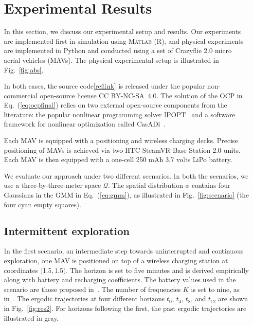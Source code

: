 \documentclass[letterpaper,10pt,conference,twoside]{IEEEtran}
\theoremstyle{definition}
\begin{document}
\section{Experimental Results}\label{sec:res}
\noindent
In this section, we discuss our experimental setup and results. Our experiments are implemented first in simulation using  \textsc{Matlab} (R), and physical experiments  are implemented in Python and conducted using a set of Crazyflie 2.0 micro aerial vehicles (MAVs). The physical experimental setup is illustrated in Fig.~\ref{fig:abs}.

In both cases, the source code\cref{reflink} is released under the popular non-commercial open-source license CC BY-NC-SA~4.0. The solution of the OCP in Eq.~(\ref{eq:ocpfinal}) relies on two external open-source components from the literature: the popular nonlinear programming solver IPOPT~\cite{wachter2006implementation} and a software framework for nonlinear optimization called CasADi~\cite{andersson2012casadi}.

Each MAV is equipped with a positioning and wireless charging decks. Precise positioning of MAVs is achieved via two HTC SteamVR Base Station 2.0 units. Each MAV is then equipped with a one-cell 250 mAh 3.7 volts LiPo battery.%

We evaluate our approach under two different scenarios. In both the scenarios, we use a three-by-three-meter space $\mathcal{Q}$. The spatial distribution $\phi$ contains four Gaussians in the GMM in Eq.~(\ref{eq:gmm}), as illustrated in Fig.~\ref{fig:scenario} (the four cyan empty squares).

\subsection*{Intermittent exploration}
\noindent
In the first scenario, an intermediate step towards uninterrupted and continuous exploration, one MAV is positioned on top of a wireless charging station at coordinates $($1.5$,$1.5$)$. The horizon is set to five minutes and is derived empirically along with battery and recharging coefficients. The battery values used in the scenario are those proposed in~\cite{zhao2017observability}. The number of frequencies $K$ is set to nine, as in~\cite{calinon2020mixture}. The ergodic trajectories at four different horizons $t_0$, $t_4$, $t_8$, and $t_{12}$ are shown in Fig.~\ref{fig:res2}. For horizons following the first, the past ergodic trajectories are illustrated in gray.
\end{document}

